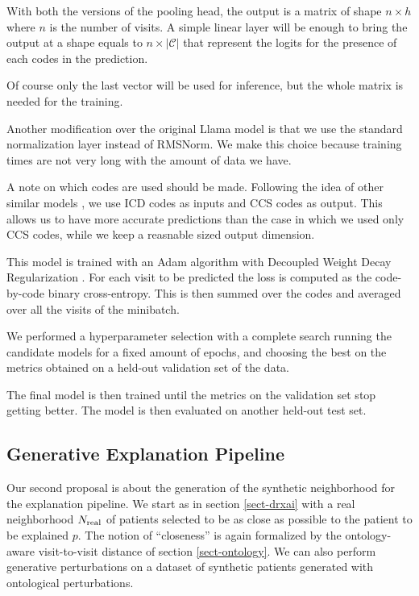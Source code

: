 \documentclass[]{marticle}
\newcommand{\codes}{\mathcal{C}}
\begin{document}
With both the versions of the pooling head, the output is a matrix of shape $n \times h$ where $n$
is the number of visits. A simple linear layer will be enough to bring the output at a shape equals
to $n \times |\codes|$ that represent the logits for the presence of each codes in the prediction.

Of course only the last vector will be used for inference, but the whole matrix is needed for the
training.

Another modification over the original Llama model is that we use the standard normalization layer
instead of RMSNorm. We make this choice because training times are not very long with the amount of
data we have.

A note on which codes are used should be made. Following the idea of other similar models
\cite{setor-paper}, we use ICD codes as inputs and CCS codes as output. This allows us to have more
accurate predictions than the case in which we used only CCS codes, while we keep a reasnable sized
output dimension.

This model is trained with an Adam algorithm with Decoupled Weight Decay Regularization
\cite{paper-adamw}. For each visit to be predicted the loss is computed as the code-by-code binary
cross-entropy. This is then summed over the codes and averaged over all the visits of the minibatch.

We performed a hyperparameter selection with a complete search running the candidate models for a
fixed amount of epochs, and choosing the best on the metrics obtained on a held-out validation set
of the data.

The final model is then trained until the metrics on the validation set stop getting better. The
model is then evaluated on another held-out test set.

\subsection{Generative Explanation Pipeline}

Our second proposal is about the generation of the synthetic neighborhood for the explanation
pipeline. We start as in section \ref{sect-drxai} with a real neighborhood $N_\text{real}$ of patients
selected to be as close as possible to the patient to be explained $p$. The notion of ``closeness''
is again formalized by the ontology-aware visit-to-visit distance of section \ref{sect-ontology}.
We can also perform generative perturbations on a dataset of synthetic patients generated with
ontological perturbations.
\end{document}
